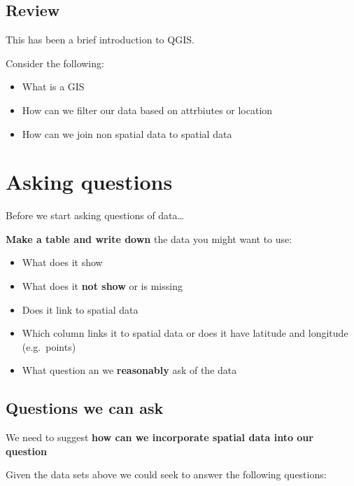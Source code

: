 \documentclass[
  letterpaper,
]{scrbook}
\providecommand{\tightlist}{%
  \setlength{\itemsep}{0pt}\setlength{\parskip}{0pt}}\usepackage{longtable,booktabs,array}
\begin{document}
\hypertarget{review}{%
\section{Review}\label{review}}

This has been a brief introduction to QGIS.

Consider the following:

\begin{itemize}
\tightlist
\item
  What is a GIS
\item
  How can we filter our data based on attrbiutes or location
\item
  How can we join non spatial data to spatial data
\end{itemize}


\hypertarget{asking-questions}{%
\chapter{Asking questions}\label{asking-questions}}

Before we start asking questions of data\ldots{}

\textbf{Make a table and write down} the data you might want to use:

\begin{itemize}
\tightlist
\item
  What does it show
\item
  What does it \textbf{not show} or is missing
\item
  Does it link to spatial data
\item
  Which column links it to spatial data or does it have latitude and
  longitude (e.g.~points)
\item
  What question an we \textbf{reasonably} ask of the data
\end{itemize}

\hypertarget{questions-we-can-ask-1}{%
\section{Questions we can ask}\label{questions-we-can-ask-1}}

We need to suggest \textbf{how can we incorporate spatial data into our
question}

Given the data sets above we could seek to answer the following
questions:
\end{document}
